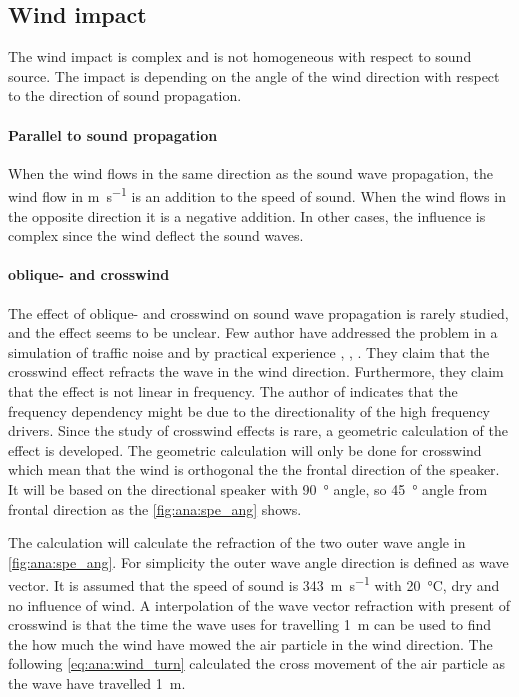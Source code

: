 \subsection{Wind impact}
The wind impact is complex and is not homogeneous with respect to sound source. The impact is depending on the angle of the wind direction with respect to the direction of sound propagation. 


\paragraph{Parallel to sound propagation} When the wind flows in the same direction as the sound wave propagation, the wind flow in \si{\meter\per\second} is an addition to the speed of sound. When the wind flows in the opposite direction it is a negative addition.  In other cases, the influence is complex since the wind deflect the sound waves.

\paragraph{oblique- and crosswind} The effect of oblique- and crosswind on sound wave propagation is rarely studied, and the effect seems to be unclear. Few author have addressed the problem in a simulation of traffic noise and by practical experience \citep{effect_of_wind}, \citep{crosswind_effect_2016}, \citep{BALLOU2008xi}. They claim that the crosswind effect refracts the wave in the wind direction. Furthermore, they claim that the effect is not linear in frequency. The author of \citep{BALLOU2008xi} indicates that the frequency dependency might be due to the directionality of the high frequency drivers. Since the study of crosswind effects is rare, a geometric calculation of the effect is developed. The geometric calculation will only be done for crosswind which mean that the wind is orthogonal the the frontal direction of the speaker. It will be based on the directional speaker with \SI{90}{\degree} angle, so \SI{45}{\degree} angle from frontal direction as the \autoref{fig:ana:spe_ang} shows.




The calculation will calculate the refraction of the two outer wave angle in \autoref{fig:ana:spe_ang}. For simplicity the outer wave angle direction is defined as wave vector. It is assumed that the speed of sound is \SI{343}{\meter\per\second} with \SI{20}{\celsius}, dry and no influence of wind. A interpolation of the wave vector refraction with present of crosswind is that the time the wave uses for travelling \SI{1}{\meter} can be used to find the how much the wind have mowed the air particle in the wind direction. The following \autoref{eq:ana:wind_turn} calculated the cross movement of the air particle as the wave have travelled  \SI{1}{\meter}.

